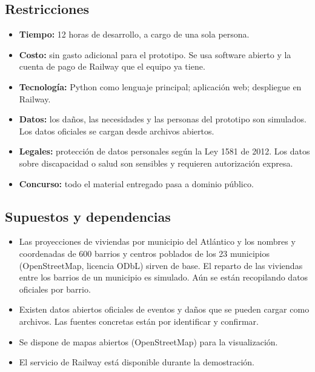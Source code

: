 \subsection{Restricciones}
\begin{itemize}
  \item \textbf{Tiempo:} 12 horas de desarrollo, a cargo de una sola persona.
  \item \textbf{Costo:} sin gasto adicional para el prototipo. Se usa software abierto y la cuenta de pago de Railway que el equipo ya tiene.
  \item \textbf{Tecnología:} Python como lenguaje principal; aplicación web; despliegue en Railway.
  \item \textbf{Datos:} los daños, las necesidades y las personas del prototipo son simulados. Los datos oficiales se cargan desde archivos abiertos.
  \item \textbf{Legales:} protección de datos personales según la Ley 1581 de 2012. Los datos sobre discapacidad o salud son sensibles y requieren autorización expresa.
  \item \textbf{Concurso:} todo el material entregado pasa a dominio público.
\end{itemize}

\subsection{Supuestos y dependencias}
\begin{itemize}
  \item Las proyecciones de viviendas por municipio del Atlántico y los nombres y coordenadas de 600 barrios y centros poblados de los 23 municipios (OpenStreetMap, licencia ODbL) sirven de base. El reparto de las viviendas entre los barrios de un municipio es simulado. Aún se están recopilando datos oficiales por barrio.
  \item Existen datos abiertos oficiales de eventos y daños que se pueden cargar como archivos. Las fuentes concretas están por identificar y confirmar.
  \item Se dispone de mapas abiertos (OpenStreetMap) para la visualización.
  \item El servicio de Railway está disponible durante la demostración.
\end{itemize}

